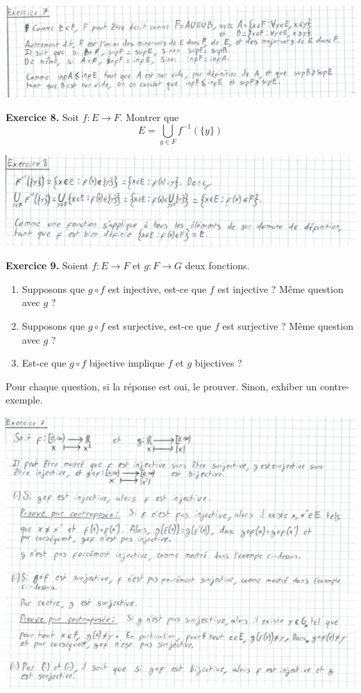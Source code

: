 \documentclass[a4paper, 10pt]{report}
\begin{document}
	\includegraphics{ex07.jpg}
		
	\newpage
	
	\noindent
	\textbf{Exercice 8.} Soit $f : E \to F$. Montrer que
	\[
		E = \bigcup\limits_{y \in F} f^{-1}(\{y\})
	\]
	
	\includegraphics{ex08.jpg}
	
	\vspace{5mm}
	\noindent
	\textbf{Exercice 9.} Soient $f : E \to F$ et $g : F \to G$ deux
	fonctions.
	\begin{enumerate}[label=(\roman*)]
		\item Supposons que $g \circ f$ est injective, est-ce que
		$f$ est injective ? Même question avec $g$ ?
		\item Supposons que $g \circ f$ est surjective, est-ce que
		$f$ est surjective ? Même question avec $g$ ?
		\item Est-ce que $g \circ f$ bijective implique $f$ et $g$
		bijectives ?
	\end{enumerate}	
	Pour chaque question, si la réponse est oui, le prouver.
	Sinon, exhiber un contre-exemple.
	
	\includegraphics{ex09.jpg}
	
\end{document}
